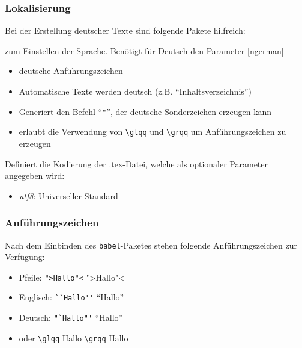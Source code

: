 \begin{frame}[fragile]
\frametitle{Lokalisierung}
Bei der Erstellung deutscher Texte sind folgende Pakete hilfreich:
\begin{description}[<+->]
  \item[babel] zum Einstellen der Sprache. Benötigt für Deutsch den Parameter [ngerman]
    \begin{itemize}
      \item deutsche Anführungszeichen
      \item Automatische Texte werden deutsch (z.B. ``Inhaltsverzeichnis'')
      \item Generiert den Befehl ``\verb+"+'', der deutsche Sonderzeichen erzeugen kann
      \item erlaubt die Verwendung von \verb+\glqq+ und \verb+\grqq+ um Anführungszeichen zu erzeugen
    \end{itemize}
  \item[inputenc] Definiert die Kodierung der .tex-Datei, welche als optionaler Parameter angegeben wird:
    \begin{itemize}
      \item \emph{utf8}: Universeller Standard
    \end{itemize}
\end{description}  
\end{frame}



\begin{frame}[fragile]
\frametitle{Anführungszeichen}
Nach dem Einbinden des \texttt{babel}-Paketes stehen folgende Anführungszeichen zur Verfügung: \pause

\begin{itemize}[<+->]
\item Pfeile: \verb+">Hallo"<+ ">Hallo"<
\item Englisch: \verb+``Hallo''+ ``Hallo''
\item Deutsch: \verb+"`Hallo"'+ "`Hallo"' 
\item oder \verb+\glqq+ Hallo \verb+\grqq+ \glqq Hallo\grqq 
\end{itemize}
\end{frame}



